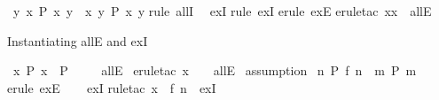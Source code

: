\begin{isabellebody}
\isamarkupfalse%
\ {\isachardoublequoteopen}{\isasymexists}y{\isachardot}{\kern0pt}\ {\isasymforall}x{\isachardot}{\kern0pt}\ P\ x\ y\ {\isasymLongrightarrow}\ {\isasymforall}x{\isachardot}{\kern0pt}\ {\isasymexists}y{\isachardot}{\kern0pt}\ P\ x\ y{\isachardoublequoteclose}\isanewline
%
\isadelimproof
%
\endisadelimproof
%
\isatagproof
{}\isamarkupfalse%
{\isacharparenleft}{\kern0pt}rule\ allI{\isacharparenright}{\kern0pt}\ \isamarkupfalse%
\ exI\isanewline
{}\isamarkupfalse%
{\isacharparenleft}{\kern0pt}rule\ exI{\isacharparenright}{\kern0pt}\isanewline
{}\isamarkupfalse%
{\isacharparenleft}{\kern0pt}erule\ exE{\isacharparenright}{\kern0pt}\isanewline
{}\isamarkupfalse%
{\isacharparenleft}{\kern0pt}erule{\isacharunderscore}{\kern0pt}tac\ x{\isacharequal}{\kern0pt}{\isachardoublequoteopen}x{\isachardoublequoteclose}\ \ allE{\isacharparenright}{\kern0pt}\isanewline
\ \ \isamarkupfalse%
%
\endisatagproof
{\isafoldproof}%
%
\isadelimproof
%
\endisadelimproof
%
\begin{isamarkuptext}%
Instantiating allE and exI%
\end{isamarkuptext}\isamarkuptrue%
\isamarkupfalse%
\ {\isachardoublequoteopen}{\isasymforall}x{\isachardot}{\kern0pt}\ P\ x\ {\isasymLongrightarrow}\ P\ {}{}{\isachardoublequoteclose}\isanewline
\ \ \isamarkupfalse%
\ allE\isanewline
%
\isadelimproof
%
\endisadelimproof
%
\isatagproof
{}\isamarkupfalse%
\ {\isacharparenleft}{\kern0pt}erule{\isacharunderscore}{\kern0pt}tac\ x\ {\isacharequal}{\kern0pt}\ {\isachardoublequoteopen}{}{}{\isachardoublequoteclose}\ \ allE{\isacharparenright}{\kern0pt}\isanewline
{}\isamarkupfalse%
\ assumption\isanewline
{}\isamarkupfalse%
%
\endisatagproof
{\isafoldproof}%
%
\isadelimproof
\isanewline
%
\endisadelimproof
\isanewline
{}\isamarkupfalse%
\ {\isachardoublequoteopen}{\isasymexists}n{\isachardot}{\kern0pt}\ P\ {\isacharparenleft}{\kern0pt}f\ n{\isacharparenright}{\kern0pt}\ {\isasymLongrightarrow}\ {\isasymexists}m{\isachardot}{\kern0pt}\ P\ m{\isachardoublequoteclose}\isanewline
%
\isadelimproof
\ \ %
\endisadelimproof
%
\isatagproof
{}\isamarkupfalse%
{\isacharparenleft}{\kern0pt}erule\ exE{\isacharparenright}{\kern0pt}\isanewline
\ \ \isamarkupfalse%
\ exI\isanewline
{}\isamarkupfalse%
{\isacharparenleft}{\kern0pt}rule{\isacharunderscore}{\kern0pt}tac\ x\ {\isacharequal}{\kern0pt}\ {\isachardoublequoteopen}f\ n{\isachardoublequoteclose}\ \ exI{\isacharparenright}{\kern0pt}\isanewline

\end{isabellebody}
